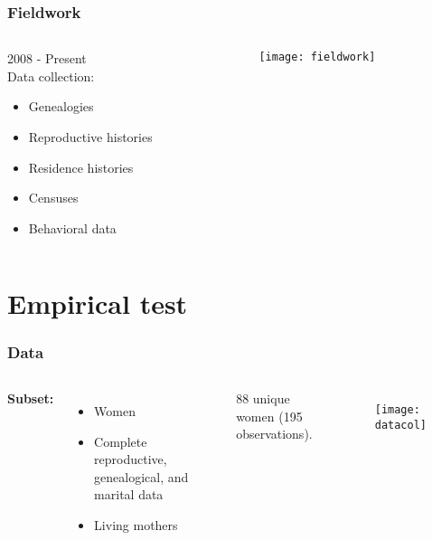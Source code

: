\documentclass{beamer}
\begin{document}
\begin{frame}
\frametitle{Fieldwork}

\begin{columns}
\begin{column}{.5\textwidth}
2008 - Present \\
\vspace{0.25cm}
Data collection:
\begin{itemize}
\item Genealogies
\item Reproductive histories 
\item Residence histories 
\item Censuses
\item Behavioral data
\end{itemize}
\end{column}

\begin{column}{.5\textwidth}
\texttt{[image: fieldwork]}\\
\end{column}
\end{columns}

\end{frame}


\section{Empirical test}


\begin{frame}
\frametitle{Data}
\begin{columns}[c] %

\textbf{Subset:}
\begin{itemize} 
\item Women
\item Complete reproductive, genealogical, and marital data
\item Living mothers
\end{itemize}
88 unique women (195 observations). 

\begin{figure}
\texttt{[image: datacol]}
\end{figure}

\end{columns}
\end{frame}
\end{document}
